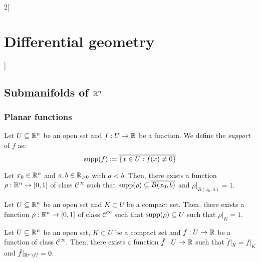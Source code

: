 \documentclass[../../../main.tex]{subfiles}
\begin{document}
\begin{multicols}{2}[\section{Differential geometry}]
  \subsection{Submanifolds of \texorpdfstring{$\mathbb{R}^n$}{Rn}}
  \subsubsection{Planar functions}
  \begin{definition}
    Let $U\subseteq\mathbb{R}^n$ be an open set and $f:U\rightarrow\mathbb{R}$ be a function. We define the \emph{support} of $f$ as:
    $$\operatorname{supp}(f):=\overline{\{x\in U:f(x)\ne 0\}}$$
  \end{definition}
  \begin{lemma}
    Let $x_0\in\mathbb{R}^n$ and $a,b\in \mathbb{R}_{>0}$ with $a<b$. Then, there exists a function $\rho:\mathbb{R}^n\rightarrow[0,1]$ of class $\mathcal{C}^\infty$ such that $\operatorname{supp}(\rho)\subseteq\overline{B(x_0,b)}$ and $\rho|_{B(x_0,a)}=1$.
  \end{lemma}
  \begin{proposition}
    Let $U\subseteq\mathbb{R}^n$ be an open set and $K\subset U$ be a compact set. Then, there exists a function $\rho:\mathbb{R}^n\rightarrow[0,1]$ of class $\mathcal{C}^\infty$ such that $\operatorname{supp}(\rho)\subseteq U$ such that $\rho|_K=1$.
  \end{proposition}
  \begin{corollary}
    Let $U\subseteq\mathbb{R}^n$ be an open set, $K\subset U$ be a compact set and $f:U\rightarrow \mathbb{R}$ be a function of class $\mathcal{C}^\infty$. Then, there exists a function $\tilde{f}:U\rightarrow \mathbb{R}$ such that $\tilde{f}|_K=f|_K$ and $\tilde{f}|_{\mathbb{R}^n\setminus U}=0$.
  \end{corollary}

\end{multicols}
\end{document}

